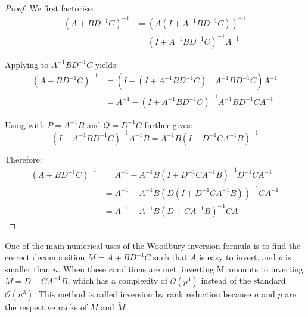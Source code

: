 \begin{proof}
	We first factorise:
	\begin{equation}
		\begin{aligned}
		\left(A+BD^{-1}C\right)^{-1}&=\left(A(I+A^{-1}BD^{-1}C)\right)^{-1}\\
		&=\left(I+A^{-1}BD^{-1}C\right)^{-1}A^{-1}
		\end{aligned}
	\end{equation}

	Applying  to $A^{-1}BD^{-1}C$ yields:
	\begin{equation}
		\begin{aligned}
		\left(A+BD^{-1}C\right)^{-1}&=\left(I-\left(I+A^{-1}BD^{-1}C\right)^{-1}A^{-1}BD^{-1}C\right)A^{-1}\\
		&=A^{-1}-\left(I+A^{-1}BD^{-1}C\right)^{-1}A^{-1}BD^{-1}CA^{-1}
		\end{aligned}
	\end{equation}

	Using  with $P=A^{-1}B$ and $Q=D^{-1}C$ further gives:
	\begin{equation}
		\left(I+A^{-1}BD^{-1}C\right)^{-1}A^{-1}B=A^{-1}B\left(I+D^{-1}CA^{-1}B\right)^{-1}
	\end{equation}

	Therefore:
	\begin{equation}
		\begin{aligned}
		\left(A+BD^{-1}C\right)^{-1}&=A^{-1}-A^{-1}B\left(I+D^{-1}CA^{-1}B\right)^{-1}D^{-1}CA^{-1}\\
		&=A^{-1}-A^{-1}B\left(D(I+D^{-1}CA^{-1}B)\right)^{-1}CA^{-1}\\
		&=A^{-1}-A^{-1}B\left(D+CA^{-1}B\right)^{-1}CA^{-1}
		\end{aligned}
	\end{equation}
\end{proof}

\begin{remark}
	One of the main numerical uses of the Woodbury inversion formula is to find the correct decomposition $M=A+BD^{-1}C$ such that $A$ is easy to invert, and $p$ is smaller than $n$. When these conditions are met, inverting M amounts to inverting $\tilde{M}=D+CA^{-1}B$, which has a complexity of $\mathcal{O}(p^3)$ instead of the standard $\mathcal{O}(n^3)$. This method is called inversion by rank reduction because $n$ and $p$ are the respective ranks of $M$ and $\tilde{M}$.
\end{remark}
